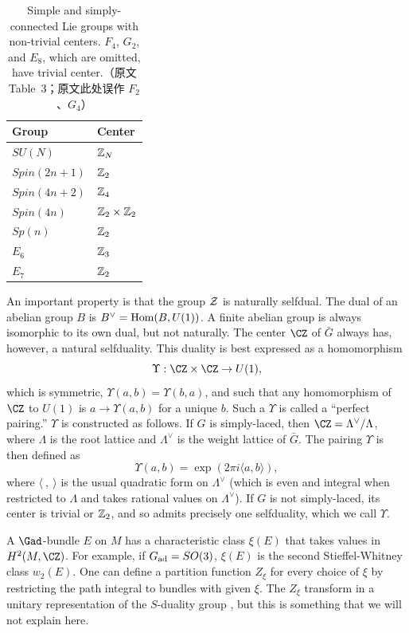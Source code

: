 \begin{table}[htbp]
\centering
\begin{tabular}{ll}
\toprule
Group & Center \\
\midrule
$SU(N)$ & $\Bbb{Z}_N$ \\
$Spin(2n+1)$ & $\Bbb{Z}_2$ \\
$Spin(4n+2)$ & $\Bbb{Z}_4$ \\
$Spin(4n)$ & $\Bbb{Z}_2\times\Bbb{Z}_2$ \\
$Sp(n)$ & $\Bbb{Z}_2$ \\
$E_6$ & $\Bbb{Z}_3$ \\
$E_7$ & $\Bbb{Z}_2$ \\
\bottomrule
\end{tabular}
\caption{Simple and simply-connected Lie groups with non-trivial centers. $F_4$, $G_2$, and $E_8$, which are omitted, have trivial center.（原文 Table~3；原文此处误作 $F_2$、$G_4$）}
\label{tab:centers}
\end{table}

An important property  is that the group ${\cal Z}$ is naturally
selfdual.  The dual of an abelian group $B$ is $B^\vee={\rm
Hom}(B,U(1))$.  A finite abelian group is always isomorphic to its
own dual, but not naturally.  The center $\CZ$ of  $\bar G$ always
has, however, a natural selfduality. This duality is best
expressed as a homomorphism %
\setcounter{equation}{0}
\begin{equation}\label{eq:plook}
\Upsilon:\CZ\times \CZ\to
U(1),
\end{equation}
 which is symmetric, $\Upsilon(a,b)=\Upsilon(b,a)$, and such
that any homomorphism of $\CZ$ to $U(1)$ is $a\to \Upsilon(a,b)$
for a unique $b$.  Such a $\Upsilon$ is called a ``perfect
pairing.'' $\Upsilon$ is constructed as follows.  If $G$ is
simply-laced, then $\CZ=\Lambda^\vee/\Lambda$, where $\Lambda$ is
the root lattice and $\Lambda^\vee$ is the weight lattice of $\bar
G$.  The pairing $\Upsilon$ is then defined as
\setcounter{equation}{1}
\begin{equation}\label{eq:rofo}
\Upsilon(a,b)=\exp(2\pi i\langle a,b\rangle),
\end{equation}
 where
$\langle~,~\rangle$ is the usual quadratic form on $\Lambda^\vee$
(which is even and integral when restricted to $\Lambda$ and takes
rational values on $\Lambda^\vee$). If $G$ is not simply-laced,
its center is trivial or $\Bbb{Z}_2$, and so admits precisely one
selfduality, which we call $\Upsilon$.

 A $\Gad$-bundle $E$ on $M$ has a characteristic class $\xi(E)$
that takes values in $H^2(M,\CZ)$. For example, if $G_{{\rm
ad}}=SO(3)$, $\xi(E)$ is the second Stieffel-Whitney class
$w_2(E)$.  One can define a partition function $Z_\xi$ for every
choice of $\xi$ by restricting the path integral to bundles with
given $\xi$.  The $Z_\xi$ transform in a unitary representation of
the $S$-duality group \cite{ref45,ref26}, but this is
something that we will not explain here.


